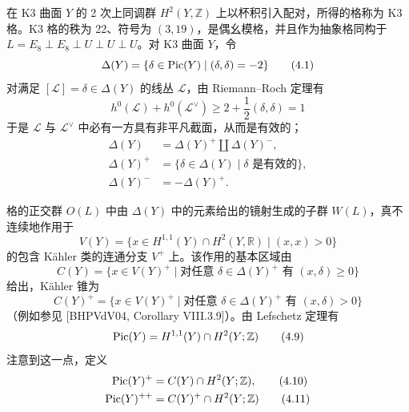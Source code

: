 在 K3 曲面 $Y$ 的 2 次上同调群 $H^{2}(Y,\mathbb{Z})$ 上以杯积引入配对，所得的格称为 K3 格。K3 格的秩为 22、符号为 $(3,19)$，是偶幺模格，并且作为抽象格同构于 $L=E_{8}\perp E_{8}\perp U\perp U\perp U$。对 K3 曲面 $Y$，令
\begin{equation}
  \Delta(Y)=\{\delta\in\operatorname{Pic}(Y)\mid(\delta,\delta)=-2\} \tag{4.1}
\end{equation}
对满足 $[\mathcal{L}]=\delta\in\Delta(Y)$ 的线丛 $\mathcal{L}$，由 Riemann–Roch 定理有
\begin{equation}
  h^{0}(\mathcal{L})+h^{0}(\mathcal{L}^{\vee})\ge 2+\frac{1}{2}(\delta,\delta)=1 \tag{4.2}
\end{equation}
于是 $\mathcal{L}$ 与 $\mathcal{L}^{\vee}$ 中必有一方具有非平凡截面，从而是有效的；
\begin{align}
  \Delta(Y)&=\Delta(Y)^{+}\coprod\Delta(Y)^{-}, \tag{4.3}\\
  \Delta(Y)^{+}&=\{\delta\in\Delta(Y)\mid\delta\text{ 是有效的}\}, \tag{4.4}\\
  \Delta(Y)^{-}&=-\Delta(Y)^{+}. \tag{4.5}
\end{align}


格的正交群 $O(L)$ 中由 $\Delta(Y)$ 中的元素给出的镜射生成的子群 $W(L)$，真不连续地作用于
\begin{equation}
  V(Y)=\{x\in H^{1,1}(Y)\cap H^{2}(Y,\mathbb{R})\mid (x,x)>0\} \tag{4.6}
\end{equation}
的包含 Kähler 类的连通分支 $V^{+}$ 上。该作用的基本区域由
\begin{equation}
  C(Y)=\{x\in V(Y)^{+}\mid\text{对任意 }\delta\in\Delta(Y)^{+}\text{ 有 }(x,\delta)\ge 0\} \tag{4.7}
\end{equation}
给出，Kähler 锥为
\begin{equation}
  C(Y)^{+}=\{x\in V(Y)^{+}\mid\text{对任意 }\delta\in\Delta(Y)^{+}\text{ 有 }(x,\delta)>0\} \tag{4.8}
\end{equation}
（例如参见 [BHPVdV04, Corollary VIII.3.9]）。由 Lefschetz 定理有
\begin{equation}
  \operatorname{Pic}(Y)=H^{1,1}(Y)\cap H^{2}(Y;\mathbb{Z}) \tag{4.9}
\end{equation}
注意到这一点，定义
\begin{align}
  \operatorname{Pic}(Y)^{+}&=C(Y)\cap H^{2}(Y;\mathbb{Z}), \tag{4.10}\\
  \operatorname{Pic}(Y)^{++}&=C(Y)^{+}\cap H^{2}(Y;\mathbb{Z}) \tag{4.11}
\end{align}

